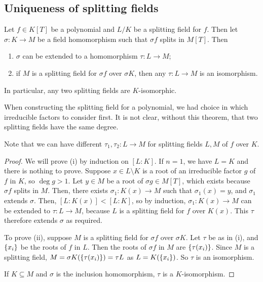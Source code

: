 \subsection{Uniqueness of splitting fields}
\begin{theorem}
	Let \( f \in K[T] \) be a polynomial and \( L / K \) be a splitting field for \( f \).
	Then let \( \sigma \colon K \to M \) be a field homomorphism such that \( \sigma f \) splits in \( M[T] \).
	Then
	\begin{enumerate}
		\item \( \sigma \) can be extended to a homomorphism \( \tau \colon L \to M \);
		\item if \( M \) is a splitting field for \( \sigma f \) over \( \sigma K \), then any \( \tau \colon L \to M \) is an isomorphism.
	\end{enumerate}
	In particular, any two splitting fields are \( K \)-isomorphic.
\end{theorem}
\begin{remark}
	When constructing the splitting field for a polynomial, we had choice in which irreducible factors to consider first.
	It is not clear, without this theorem, that two splitting fields have the same degree.

	Note that we can have different \( \tau_1, \tau_2 \colon L \to M \) for splitting fields \( L, M \) of \( f \) over \( K \).
\end{remark}
\begin{proof}
	We will prove (i) by induction on \( [L : K] \).
	If \( n = 1 \), we have \( L = K \) and there is nothing to prove.
	Suppose \( x \in L \setminus K \) is a root of an irreducible factor \( g \) of \( f \) in \( K \), so \( \deg g > 1 \).
	Let \( y \in M \) be a root of \( \sigma g \in M[T] \), which exists because \( \sigma f \) splits in \( M \).
	Then, there exists \( \sigma_1 \colon K(x) \to M \) such that \( \sigma_1(x) = y \), and \( \sigma_1 \) extends \( \sigma \).
	Then, \( [L : K(x)] < [L : K] \), so by induction, \( \sigma_1 \colon K(x) \to M \) can be extended to \( \tau \colon L \to M \), because \( L \) is a splitting field for \( f \) over \( K(x) \).
	This \( \tau \) therefore extends \( \sigma \) as required.

	To prove (ii), suppose \( M \) is a splitting field for \( \sigma f \) over \( \sigma K \).
	Let \( \tau \) be as in (i), and \( \qty{x_i} \) be the roots of \( f \) in \( L \).
	Then the roots of \( \sigma f \) in \( M \) are \( \qty{\tau(x_i)} \).
	Since \( M \) is a splitting field, \( M = \sigma K(\qty{\tau(x_i)}) = \tau L \) as \( L = K(\qty{x_i}) \).
	So \( \tau \) is an isomorphism.

	If \( K \subseteq M \) and \( \sigma \) is the inclusion homomorphism, \( \tau \) is a \( K \)-isomorphism.
\end{proof}
